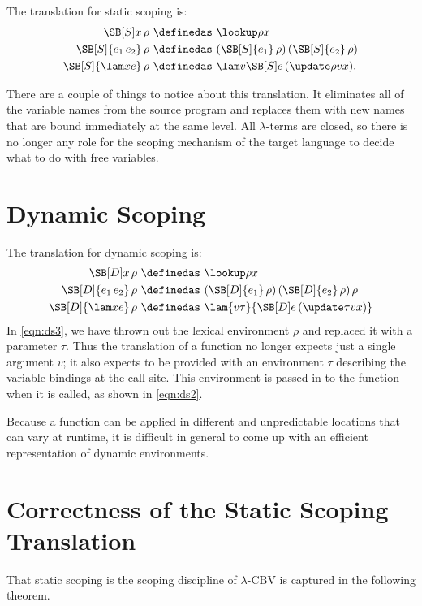The translation for static scoping is:
\begin{align*}
\SB[S] x\,\rho\ &\definedas\ \lookup\rho x\\
\SB[S]{e_1\,e_2}\,\rho\ &\definedas\ {(\SB[S]{e_1}\,\rho)\,(\SB[S]{e_2}\,\rho)}\\
\SB[S]{\lam xe}\,\rho\ &\definedas\ \lam v{\SB[S] e\,(\update\rho vx)}.
\end{align*}

There are a couple of things to notice about this translation. It
eliminates all of the variable names from the source program and
replaces them with new names that are bound immediately at the same
level. All $\lambda$-terms are closed, so there is no longer any role
for the scoping mechanism of the target language to decide what to do
with free variables.

\section{Dynamic Scoping}

The translation for dynamic scoping is:
\begin{align}
\SB[D] x\,\rho\ &\definedas\ \lookup\rho x\nonumber\\
\SB[D]{e_1\,e_2}\,\rho\ &\definedas\ (\SB[D]{e_1}\,\rho)\,(\SB[D]{e_2}\,\rho)\,\rho\label{eqn:ds2}\\
\SB[D]{\lam xe}\,\rho\ &\definedas\ \lam{v\tau}{\SB[D]e\,(\update\tau vx)}\label{eqn:ds3}
\end{align}
In \eqref{eqn:ds3}, we have thrown out the lexical environment $\rho$ and replaced it with
a parameter $\tau$.  Thus the translation of a function no longer expects just
a single argument $v$; it also expects to be
provided with an environment $\tau$ describing the variable bindings at
the call site.  This environment is passed in to the function
when it is called, as shown in \eqref{eqn:ds2}.

Because a function can be applied in different and unpredictable
locations that can vary at runtime, it is difficult in general to come up with an efficient
representation of dynamic environments.

\section{Correctness of the Static Scoping Translation}

That static scoping is the scoping discipline of $\lambda$-CBV is captured in the following theorem.

